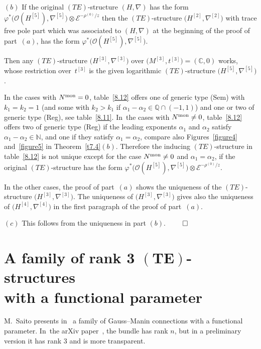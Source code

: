 \documentclass[pdftex]{sigma}%
\numberwithin{equation}{section}
\numberwithin{figure}{section}
\newcommand{\N}{{\mathbb N}}
\newcommand{\Q}{{\mathbb Q}}
\newcommand{\C}{{\mathbb C}}
\newcommand{\EE}{{\mathcal E}}
\newcommand{\OO}{{\mathcal O}}
\newcommand{\nnn}{\nabla}
\begin{document}
\medskip
$(b)$ If the original $(TE)$-structure $(H,\nnn)$ has
the form
$\varphi^*\big(\OO(H^{[5]}),\nnn^{[5]}\big)\otimes\EE^{-\rho^{(0)}/z}$
then the $(TE)$-structure $\big(H^{[2]},\nnn^{[2]}\big)$
with trace free pole part which was associated to
$(H,\nnn)$ at the beginning of the proof of part~$(a)$,
has the form $\varphi^*\big(\OO(H^{[5]}),\nnn^{[5]}\big)$.

Then any $(TE)$-structure $\big(H^{[3]},\nnn^{[3]}\big)$
over $\big(M^{[3]},t^{[3]}\big)=(\C,0)$ works, whose restriction
over~$t^{[3]}$ is the given logarithmic $(TE)$-structure
$\big(H^{[5]},\nnn^{[5]}\big)$.

In the cases with $N^{\rm mon}=0$, table~\eqref{8.12} offers
one of generic type (Sem) with $k_1=k_2=1$
(and some with $k_2>k_1$ if $\alpha_1-\alpha_2\in\Q\cap (-1,1)$)
and one or two of generic type (Reg), see table~\eqref{8.11}. In~the cases with $N^{\rm mon}\neq 0$, table~\eqref{8.12}
offers two of generic type (Reg) if the leading exponents
$\alpha_1$ and $\alpha_2$ satisfy $\alpha_1-\alpha_2\in\N$,
and one if they satisfy $\alpha_1=\alpha_2$,
compare also Figures~\ref{figure4} and~\ref{figure5} in Theorem~\ref{t7.4}$(b)$.
Therefore the inducing $(TE)$-structure in table~\eqref{8.12}
is not unique except for the case $N^{\rm mon}\neq 0$ and
$\alpha_1=\alpha_2$,
if the original $(TE)$-structure has the form
$\varphi^*\big(\OO(H^{[5]}),\nnn^{[5]}\big)\otimes\EE^{-\rho^{(0)}/z}$.

{\sloppy
In the other cases, the proof of part~$(a)$ shows the
uniqueness of the $(TE)$-structure $\big(H^{[3]},\nnn^{[3]}\big)$.
The uniqueness of $\big(H^{[3]},\nnn^{[3]}\big)$
gives also the uniqueness of $\big(H^{[4]},\nnn^{[4]}\big)$
in the first paragraph of the proof of part~$(a)$.

}

\medskip
$(c)$ This follows from the uniqueness in part $(b)$.
\hfill$\qed$

\section[A family of rank 3 $(TE)$-structures with a functional parameter]
{A family of rank 3 $\boldsymbol{(TE)}$-structures\\ with a functional parameter}\label{c9}

M.~Saito presents in~\cite{SaM17} a family of
Gauss--Manin connections with a functional parameter. In~the arXiv paper~\cite{SaM17}, the bundle has rank
$n$, but in a preliminary version
it has rank 3 and is more transparent.
\end{document}
